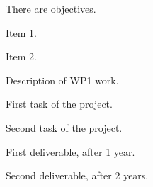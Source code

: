 \begin{workpackage}[id=WP1,wphases=0-48,
  short=First WP,%
  title=First Work Package,
  lead=PAR1,
  PAR1RM=12,
  PAR2RM=6,
  PAR3RM=24]

\begin{wpobjectives}
  There are objectives.
  \begin{compactitem}
  \item Item 1.
  \item Item 2.
  \end{compactitem}
\end{wpobjectives}

\begin{wpdescription}
  Description of WP1 work.
\end{wpdescription}

\begin{tasklist}

  \begin{task}[title=TASK1,id=task1,PM=15,lead=PAR1,wphases=0-30!0.5]

    First task of the project.
    
  \end{task}

  \begin{task}[title=TASK2,id=task2,PM=15,lead=PAR2,wphases=12-42!0.5]

    Second task of the project.
    
  \end{task}

\end{tasklist}

\begin{wpdelivs}
  \begin{wpdeliv}[due=12,id=mydeliv1,dissem=PU,nature=DEM,lead=PAR1]
      {First deliverable, after 1 year.}
  \end{wpdeliv}
  \begin{wpdeliv}[due=24,id=mydeliv2,dissem=PU,nature=DEM,lead=PAR2]
      {Second deliverable, after 2 years.}
\end{wpdeliv}
\end{wpdelivs}

\end{workpackage}
